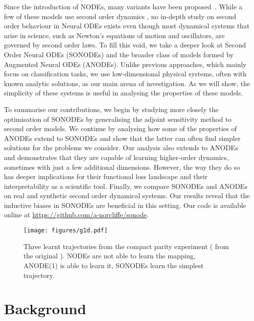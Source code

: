 \documentclass{article}
\theoremstyle{remark}
\theoremstyle{definition}
\begin{document}
Since the introduction of NODEs, many variants have been proposed~\citep{jia2019neural, Tzen2019NeuralSD, dupont2019augmented, Zhang2019ANODEV2AC, yldz2019ode2vae, poli2019graph, massaroli2020dissecting}. While a few of these models use second order dynamics \citep{yldz2019ode2vae, poli2019graph, massaroli2020dissecting}, no in-depth study on second order behaviour in Neural ODEs exists even though most dynamical systems that arise in science, such as Newton's equations of motion and oscillators, are governed by second order laws. To fill this void, we take a deeper look at Second Order Neural ODEs (SONODEs) and the broader class of models formed by Augmented Neural ODEs (ANODEs). Unlike previous approaches, which mainly focus on classification tasks, we use low-dimensional physical systems, often with known analytic solutions, as our main arena of investigation. As we will show, the simplicity of these systems is useful in analysing the properties of these models.

To summarise our contributions, we begin by studying more closely the optimisation of SONODEs by generalising the adjoint sensitivity method to second order models. We continue by analysing how some of the properties of ANODEs extend to SONODEs and show that the latter can often find simpler solutions for the problems we consider. Our analysis also extends to ANODEs and demonstrates that they are capable of learning higher-order dynamics, sometimes with just a few additional dimensions. However, the way they do so has deeper implications for their functional loss landscape and their interpretability as a scientific tool. Finally, we compare SONODEs and ANODEs on real and synthetic second order dynamical systems. Our results reveal that the inductive biases in SONODEs are beneficial in this setting. Our code is available online at \url{https://github.com/a-norcliffe/sonode}.

\begin{figure}[t]
    \centering
    \texttt{[image: figures/g1d.pdf]}
    \vskip -0.1in
    \caption{Three learnt trajectories from the compact parity experiment ( from the original \citep{dupont2019augmented}). NODEs are not able to learn the mapping, ANODE(1) is able to learn it, SONODEs learn the simplest trajectory.}\label{fig: g1d}
\end{figure}

\section{Background}
\end{document}
